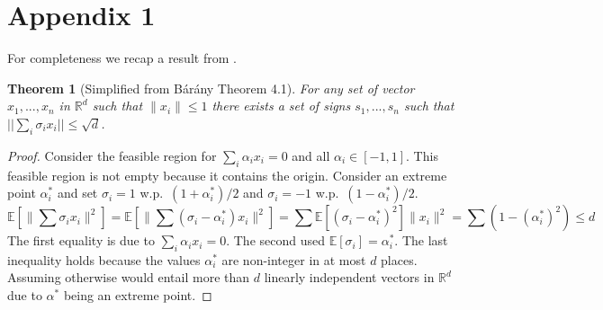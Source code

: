 \documentclass{article} %
\newtheorem{theorem}{Theorem}[section]
\newcommand{\R}{\mathbb{R}}
\newcommand{\E}{\mathbb{E}}
\newcommand{\eps}{\epsilon}
\begin{document}
%
%
%
%



\section{Appendix 1}
For completeness we recap a result from \cite{barany2008}.
\begin{theorem}[Simplified from B\'ar\'any \cite{barany2008} Theorem 4.1]
For any set of vector $x_1,...,x_n$ in $\R^d$ such that $\|x_i\| \le 1$ there exists a set of signs $s_1,...,s_n$ such that $||\sum_i \sigma_i x_i || \le \sqrt{d}$.
\end{theorem}
\begin{proof}
Consider the feasible region for $\sum_i \alpha_i x_i = 0$ and all $\alpha_i \in [-1,1]$.
This feasible region is not empty because it contains the origin. 
Consider an extreme point $\alpha^*_i$ and set $\sigma_i = 1$ w.p.\ $(1+\alpha^*_i)/2$ and $\sigma_i = -1$ w.p.\ $(1-\alpha^*_i)/2$.
$$
\E[\|\sum \sigma_i x_i\|^2] =  \E[\|\sum (\sigma_i - \alpha^*_i) x_i\|^2] = \sum \E[(\sigma_i - \alpha^*_i)^2] \|x_i\|^2= \sum (1-(\alpha_i^*)^2) \le d
$$
The first equality is due to $\sum_i \alpha_i x_i = 0$. The second used $\E[\sigma_i] = \alpha^*_i $.
The last inequality holds because the values $\alpha^*_i$ are non-integer in at most $d$ places. 
Assuming otherwise would entail more than $d$ linearly independent vectors in $\R^d$ due to $\alpha^*$ being an extreme point.
\end{proof}
\end{document}
